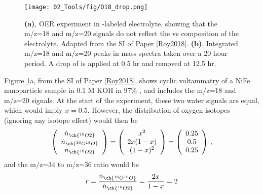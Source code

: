 \begin{figure}[b!]
	\centering
	\texttt{[image: 02\_Tools/fig/O18\_drop.png]}
	\caption{\textbf{(a)}, OER experiment in -labeled electrolyte, showing that the m/z=18 and m/z=20 signals do not reflect the  vs  composition of the electrolyte. Adapted from the SI of Paper \ref{Roy2018}. \textbf{(b)}, Integrated m/z=18 and m/z=20 peaks in mass spectra taken over a 20 hour period. A drop of  is applied at 0.5 hr and removed at 12.5 hr.}
	\label{fig:O18_drop}
\end{figure}
Figure \ref{fig:O18_drop}a, from the SI of Paper \ref{Roy2018}, shows cyclic voltammatry of a NiFe nanoparticle sample in 0.1 M KOH in 97\% , and includes the m/z=18 and m/z=20 signals. At the start of the experiment, these two water signals are equal, which would imply $x=0.5$.
However, the distribution of oxygen isotopes (ignoring any isotope effect) would then be
\begin{equation}
\left(\begin{array}{c}  \dot{n}_{\ch{^{16}O2}} \\  \dot{n}_{\ch{^{16}O^{18}O}}\\  \dot{n}_{\ch{^{18}O2}}
\end{array}  \right) = 
\left(\begin{array}{c}  x^2 \\ 2x(1-x) \\ (1-x)^2 \end{array}  \right) = 
\left(\begin{array}{c}  0.25 \\ 0.5 \\ 0.25 \end{array}  \right)\,,
\end{equation}
and the m/z=34 to m/z=36 ratio would be 
\begin{equation}
r = \frac{\dot{n}_{\ch{^{16}O^{18}O}}}{\dot{n}_{\ch{^{18}O2}}} = \frac{2x}{1-x} = 2
\end{equation}

